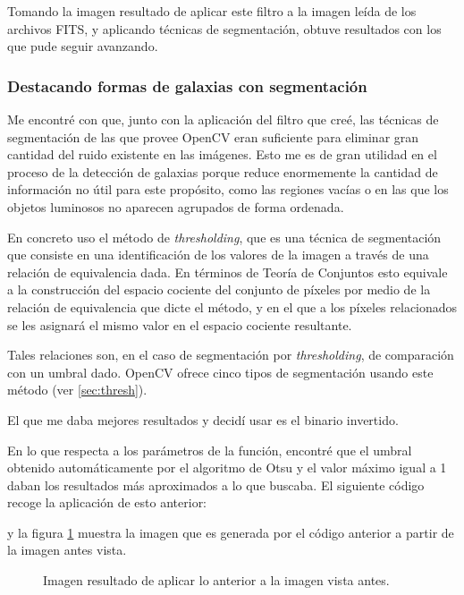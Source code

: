 \documentclass[a4paper,12pt]{article}
\begin{document}
Tomando la imagen resultado de aplicar este filtro a la imagen leída de los archivos FITS, y aplicando técnicas de segmentación, obtuve resultados con los que pude seguir avanzando.

\subsubsection{Destacando formas de galaxias con segmentación}

Me encontré con que, junto con la aplicación del filtro que creé, las técnicas de segmentación de las que provee OpenCV eran suficiente para eliminar gran cantidad del ruido existente en las imágenes. Esto me es de gran utilidad en el proceso de la detección de galaxias porque reduce enormemente la cantidad de información no útil para este propósito, como las regiones vacías o en las que los objetos luminosos no aparecen agrupados de forma ordenada.

En concreto uso el método de \textit{thresholding}, que es una técnica de segmentación que consiste en una identificación de los valores de la imagen a través de una relación de equivalencia dada. En términos de Teoría de Conjuntos esto equivale a la construcción del espacio cociente del conjunto de píxeles por medio de la relación de equivalencia que dicte el método, y en el que a los píxeles relacionados se les asignará el mismo valor en el espacio cociente resultante.

Tales relaciones son, en el caso de segmentación por \textit{thresholding}\cite{threshold}, de comparación con un umbral dado. OpenCV ofrece cinco tipos de segmentación usando este método (ver \ref{sec:thresh}).

El que me daba mejores resultados y decidí usar es el binario invertido.

En lo que respecta a los parámetros de la función, encontré que el umbral obtenido automáticamente por el algoritmo de Otsu\cite{otsu} y el valor máximo igual a 1 daban los resultados más aproximados a lo que buscaba.
El siguiente código recoge la aplicación de esto anterior:

y la figura \ref{fig:img2} muestra la imagen que es generada por el código anterior a partir de la imagen antes vista.

\begin{figure}[!h]
\centering
{}
\caption{Imagen resultado de aplicar lo anterior a la imagen vista antes.}
\label{fig:img2}
\end{figure}
\end{document}
